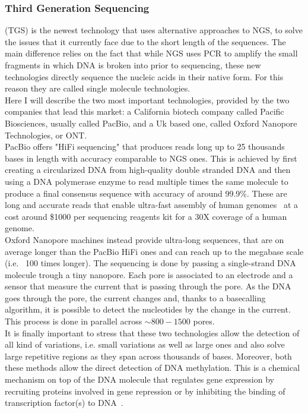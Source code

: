 \subsubsection{Third Generation Sequencing} (TGS) is the newest technology that uses alternative approaches to NGS, to solve the issues that it currently face due to the short length of the sequences. The main difference relies on the fact that while NGS uses PCR to amplify the small fragments in which DNA is broken into prior to sequencing, these new technologies directly sequence the nucleic acids in their native form. For this reason they are called single molecule technologies.\\
Here I will describe the two most important technologies, provided by the two companies that lead this market: a California biotech company called Pacific Biosciences, usually called PacBio, and a Uk based one, called Oxford Nanopore Technologies, or ONT.\\
PacBio offers "HiFi sequencing" that produces reads long up to 25 thousands bases in length with accuracy comparable to NGS ones. This is achieved by first creating a circularized DNA from high-quality double stranded DNA and then using a DNA polymerase enzyme to read multiple times the same molecule to produce a final consensus sequence with accuracy of around 99.9\%. These are long and accurate reads that enable ultra-fast assembly of human genomes~\cite{mdbg} at a cost around \$1000 per sequencing reagents kit for a 30X coverage of a human genome. \\
Oxford Nanopore machines instead provide ultra-long sequences, that are on average longer than the PacBio HiFi ones and can reach up to the megabase scale (i.e. ~100 times longer). The sequencing is done by passing a single-strand DNA molecule trough a tiny nanopore. Each pore is associated to an electrode and a sensor that measure the current that is passing through the pore. As the DNA goes through the pore, the current changes and, thanks to a basecalling algorithm, it is possible to detect the nucleotides by the change in the current. This process is done in parallel across $\sim800-1500$ pores.\\
It is finally important to stress that these two technologies allow the detection of all kind of variations, i.e. small variations as well as large ones and also solve large repetitive regions as they span across thousands of bases. Moreover, both these methods allow the direct detection of DNA methylation. This is a chemical mechanism on top of the DNA molecule that regulates gene expression  by recruiting proteins involved in gene repression or by inhibiting the binding of transcription factor(s) to DNA~\cite{methylation}. \\
